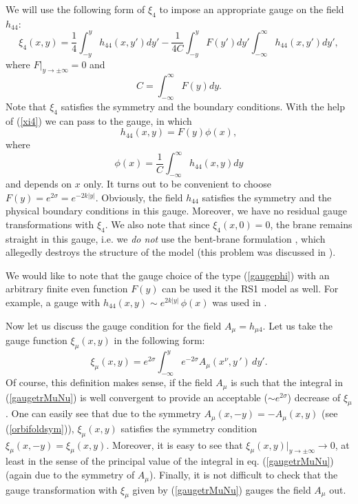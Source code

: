 \documentclass[a4paper,12pt]{article}
\begin{document}
We will use the following form of $\xi_4$ to impose an appropriate gauge on the
field $h_{44}$:
\begin{equation}\label{xi4}
\xi_4(x,y)=\frac{1}{4}\int_{-y}^y h_{44} (x,y') dy' -\frac{1}{4C}
\int_{-y}^y F(y') dy' \int_{-\infty}^{\infty} h_{44} (x,y') dy',
\end{equation}
where $F|_{y\to \pm\infty}=0$ and
\begin{equation}
C=\int_{-\infty}^{\infty} F(y) dy.
\end{equation}
Note that $\xi_4$ satisfies the symmetry and the boundary conditions.
With the help of (\ref{xi4}) we can pass to the gauge, in which
\begin{equation}\label{gaugephi}
h_{44}(x,y)=F(y)\phi(x),
\end{equation}
where
\begin{equation}
\phi(x)=\frac{1}{C}\int_{-\infty}^{\infty} h_{44} (x,y) dy
\end{equation}
and depends on $x$ only. It turns out to be convenient to choose
$F(y)=e^{2\sigma}=e^{-2k|y|}$. Obviously, the field $h_{44}$ satisfies the
symmetry and the physical boundary conditions in this gauge. Moreover, we
have no residual gauge transformations with $\xi_4$. We also note that
since $\xi_4(x,0)=0$, the brane remains straight in this gauge, i.e. we
{\it do not} use the bent-brane formulation \cite{GarTan,RKatz}, which
allegedly destroys the structure of the model (this problem was discussed
in \cite{AIMVV}).

We would like to note that the gauge choice of the type (\ref{gaugephi})
with an arbitrary finite even function $F(y)$ can be used it the RS1 model
as well. For example, a gauge with $h_{44}(x,y)\sim e^{2k|y|}\,\phi(x)$ was
used in \cite{Toharia}.

Now let us discuss the  gauge condition for the field $A_{\mu}=h_{\mu4}$.
Let us take the gauge function $\xi_{\mu}(x,y)$ in the following form:
\begin{equation}\label{gaugetrMuNu}
\xi_{\mu}(x,y)=e^{2\sigma}\int_{-\infty}^{y}e^{-2\sigma}
A_{\mu}\left(x^{\nu},y\,'\right)\,dy'.
\end{equation}
Of course, this  definition makes sense, if the field $A_{\mu}$ is such
that the integral in (\ref{gaugetrMuNu}) is well convergent to provide  an
acceptable ($\sim e^{2\sigma}$) decrease of $\xi_{\mu}$. One can easily see
that due to the symmetry $A_{\mu}(x,-y)=-A_{\mu}(x,y)$ (see
(\ref{orbifoldsym})), $\xi_{\mu}(x,y)$ satisfies the symmetry condition
$\xi_{\mu}(x,-y)=\xi_{\mu}(x,y)$. Moreover, it is easy to see that
$\xi_{\mu}(x,y)|_{y\to\pm\infty}\to 0$, at least in the sense of the
principal value of the integral in eq. (\ref{gaugetrMuNu}) (again due to
the symmetry of $A_{\mu}$). Finally, it is not difficult
to check that the gauge transformation with $\xi_{\mu}$ given by
(\ref{gaugetrMuNu}) gauges the field $A_{\mu}$ out.
\end{document}
